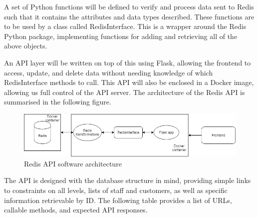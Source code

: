 \begin{flushleft}
A set of Python functions will be defined to verify and process data sent to Redis such that it contains the attributes and data types described. These functions are to be used by a class called RedisInterface. This is a wrapper around the Redis Python package, implementing functions for adding and retrieving all of the above objects.
\end{flushleft}
\begin{flushleft}
An API layer will be written on top of this using Flask, allowing the frontend to access, update, and delete data without needing knowledge of which RedisInterface methods to call. This API will also be enclosed in a Docker image, allowing us full control of the API server. The architecture of the Redis API is summarised in the following figure.
\end{flushleft}
\begin{figure}[h]
    \centering
    \includegraphics[scale=0.5]{redis_backend_diagram.png}
    \caption{Redis API software architecture}
    \label{fig:redis_architecturel}
\end{figure}
\begin{flushleft}
The API is designed with the database structure in mind, providing simple links to constraints on all levels, lists of staff and customers, as well as specific information retrievable by ID. The following table provides a list of URLs, callable methods, and expected API responses.
\end{flushleft}
